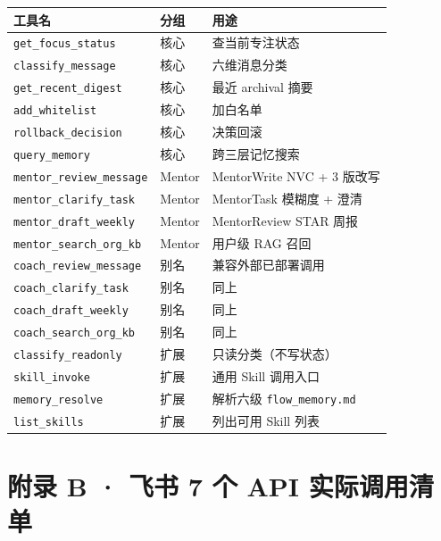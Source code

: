 \documentclass[11pt,a4paper]{ctexart}
\begin{document}
\begin{longtable}{p{4.2cm}p{2cm}p{8cm}}
\toprule
\textbf{工具名} & \textbf{分组} & \textbf{用途} \\
\midrule
\endhead
\texttt{get\_focus\_status} & 核心 & 查当前专注状态 \\
\texttt{classify\_message} & 核心 & 六维消息分类 \\
\texttt{get\_recent\_digest} & 核心 & 最近 archival 摘要 \\
\texttt{add\_whitelist} & 核心 & 加白名单 \\
\texttt{rollback\_decision} & 核心 & 决策回滚 \\
\texttt{query\_memory} & 核心 & 跨三层记忆搜索 \\
\midrule
\texttt{mentor\_review\_message} & Mentor & MentorWrite NVC + 3 版改写 \\
\texttt{mentor\_clarify\_task} & Mentor & MentorTask 模糊度 + 澄清 \\
\texttt{mentor\_draft\_weekly} & Mentor & MentorReview STAR 周报 \\
\texttt{mentor\_search\_org\_kb} & Mentor & 用户级 RAG 召回 \\
\midrule
\texttt{coach\_review\_message} & 别名 & 兼容外部已部署调用 \\
\texttt{coach\_clarify\_task} & 别名 & 同上 \\
\texttt{coach\_draft\_weekly} & 别名 & 同上 \\
\texttt{coach\_search\_org\_kb} & 别名 & 同上 \\
\midrule
\texttt{classify\_readonly} & 扩展 & 只读分类（不写状态）\\
\texttt{skill\_invoke} & 扩展 & 通用 Skill 调用入口 \\
\texttt{memory\_resolve} & 扩展 & 解析六级 \texttt{flow\_memory.md} \\
\texttt{list\_skills} & 扩展 & 列出可用 Skill 列表 \\
\bottomrule
\end{longtable}

\section*{附录 B · 飞书 7 个 API 实际调用清单}
\end{document}
